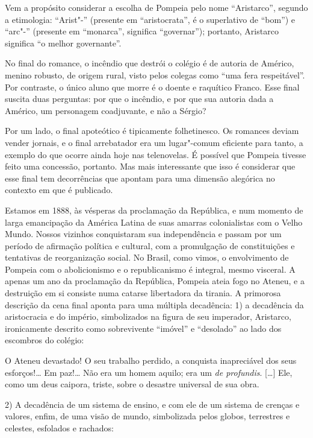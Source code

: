 Vem a propósito considerar a escolha de Pompeia pelo nome ``Aristarco'',
segundo a etimologia: ``Arist"-'' (presente em ``aristocrata'', é o
superlativo de ``bom'') e ``arc"-'' (presente em ``monarca'', significa
``governar''); portanto, Aristarco significa ``o melhor governante''.

No final do romance, o incêndio que destrói o colégio é de autoria de
Américo, menino robusto, de origem rural, visto pelos colegas como ``uma
fera respeitável''. Por contraste, o único aluno que morre é o doente e
raquítico Franco. Esse final suscita duas perguntas: por que o
incêndio, e por que sua autoria dada a Américo, um personagem
coadjuvante, e não a Sérgio?

Por um lado, o final apoteótico é tipicamente folhetinesco. Os romances
deviam vender jornais, e o final arrebatador era um lugar"-comum
eficiente para tanto, a exemplo do que ocorre ainda hoje nas
telenovelas. É possível que Pompeia tivesse feito uma concessão,
portanto. Mas mais interessante que isso é considerar que esse final
tem decorrências que apontam para uma dimensão alegórica no contexto em
que é publicado.

Estamos em 1888, às vésperas da proclamação da
República, e num momento de larga emancipação da América Latina de suas
amarras colonialistas com o Velho Mundo. Nossos vizinhos conquistaram
sua independência e passam por um período de afirmação política e
cultural, com a promulgação de constituições e tentativas de
reorganização social. No Brasil, como vimos, o envolvimento de Pompeia
com o abolicionismo e o republicanismo é integral, mesmo visceral. A
apenas um ano da proclamação da República, Pompeia ateia fogo no
Ateneu, e a destruição em si consiste numa catarse libertadora da
tirania. A primorosa descrição da cena final aponta para uma múltipla
decadência: 1) a decadência da aristocracia e do império, simbolizados
na figura de seu imperador, Aristarco, ironicamente descrito como
sobrevivente ``imóvel'' e ``desolado'' ao lado dos escombros do colégio: 

\begin{hedraquote}
O Ateneu devastado! O seu trabalho perdido, a conquista inapreciável dos
seus esforços!\ldots{} Em paz!\ldots{} Não era um homem aquilo; era um
\textit{de profundis}. [\ldots{}] Ele, como um
deus caipora, triste, sobre o desastre universal de sua obra.
\end{hedraquote}

2) A decadência de um sistema de ensino, e com ele de um sistema de crenças
e valores, enfim, de uma visão de mundo, simbolizada pelos globos,
terrestres e celestes, esfolados e rachados: 

